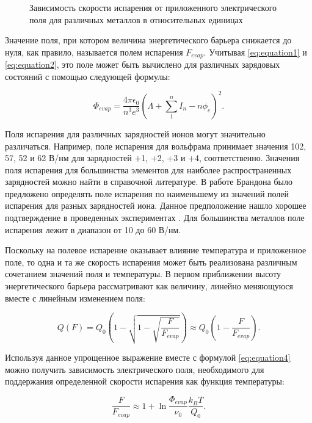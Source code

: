 \begin{figure}[ht]
	\caption{Зависимость скорости испарения от приложенного электрического поля для различных металлов в относительных единицах~\cite{Tsong78}}
	\label{fig:evapspeed}
\end{figure} 

Значение поля, при котором величина энергетического барьера снижается до нуля, как правило, называется полем испарения $F_{evap}$. Учитывая \cref{eq:equation1} и \cref{eq:equation2}, это поле может быть вычислено для различных зарядовых состояний с помощью следующей формулы: 

\begin{equation}
	\label{eq:equation5}
	\Phi_{evap} = \frac{4\pi\epsilon_0}{n^3 e^3}(\Lambda + \sum_{1}^{n} I_n - n\phi_e)^2.
\end{equation}

Поля испарения для различных зарядностей ионов могут значительно различаться. Например, поле испарения для вольфрама принимает значения 102, 57, 52 и 62 В/нм для зарядностей +1, +2, +3 и +4, соответственно. Значения поля испарения для большинства элементов для наиболее распространенных зарядностей можно найти в справочной литературе. В работе Брандона \cite{Brandon65} было предложено определять поле испарения по наименьшему из значений полей испарения для разных зарядностей иона. Данное предположение нашло хорошее подтверждение в проведенных экспериментах \cite{Tsong782}. Для большинства металлов поле испарения лежит в диапазон от 10 до 60 В/нм.

Поскольку на полевое испарение оказывает влияние температура и приложенное поле, то одна и та же скорость испарения может быть реализована различным сочетанием значений поля и температуры. В первом приближении высоту энергетического барьера рассматривают как величину, линейно меняющуюся вместе с линейным изменением поля:
 
\begin{equation}
	\label{eq:equation6}
	Q(F) = Q_0(1 - \sqrt{1 - \sqrt{\frac{F}{F_{evap}}}}) \approx Q_0 (1 - \frac{F}{F_{evap}}).
\end{equation}

Используя данное упрощенное выражение вместе с формулой \cref{eq:equation4} можно получить зависимость электрического поля, необходимого для поддержания определенной скорости испарения как функция температуры:

\begin{equation}
	\label{eq:equation7}
	\frac{F}{F_{evap}} \approx 1 + \ln{\frac{\Phi_{evap}}{\nu_0}\frac{k_B T}{Q_0}}.
\end{equation}

